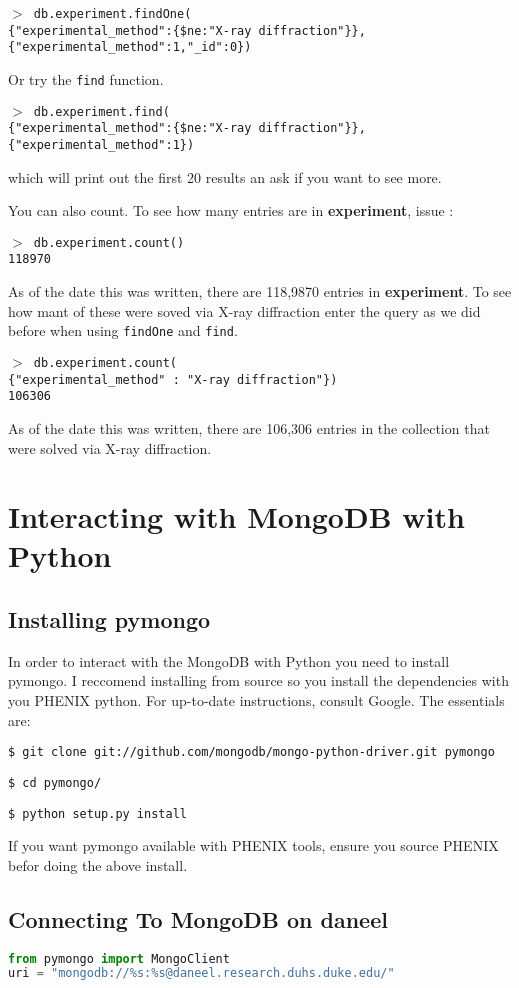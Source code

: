 \documentclass[12pt]{article}
\newcommand{\mdbcmdline}[1]{\vspace{5mm} \noindent
\texttt{$>$ #1}
\vspace{5mm}

}
\newcommand{\mdbcol}[1]{{\color{Bittersweet}\textbf{#1}}}
\begin{document}
\mdbcmdline{db.experiment.findOne(\\
\{"experimental\_method":\{\$ne:"X-ray diffraction"\}\}, \\
\{"experimental\_method":1,"\_id":0\})
}
\noindent

Or try the \texttt{find} function.

\mdbcmdline{db.experiment.find(\\
\{"experimental\_method":\{\$ne:"X-ray diffraction"\}\}, \\
\{"experimental\_method":1\})
}

\noindent
which will print out the first 20 results an ask if you want to see more.

\vspace{5mm}
\noindent
You can also count.
To see how many entries are in \mdbcol{experiment}, issue :

\mdbcmdline{db.experiment.count() \\
118970}

\noindent
As of the date this was written, there are 118,9870 entries in \mdbcol{experiment}.
To see how mant of these were soved via X-ray diffraction enter the query as we did before when using \texttt{findOne} and \texttt{find}.

\mdbcmdline{db.experiment.count(\\
\{"experimental\_method" : "X-ray diffraction"\}) \\
106306}

\noindent
As of the date this was written, there are 106,306 entries in the collection that were solved via X-ray diffraction.


\section{Interacting with MongoDB with Python}
\subsection{Installing pymongo}
In order to interact with the MongoDB with Python you need to install pymongo.
I reccomend installing from source so you install the dependencies with you PHENIX python.
For up-to-date instructions, consult Google.
The essentials are:

\vspace{5mm}
\noindent
\texttt{\$ git clone git://github.com/mongodb/mongo-python-driver.git pymongo}

\noindent
\texttt{\$ cd pymongo/}

\noindent
\texttt{\$ python setup.py install}

\vspace{5mm}
\noindent
If you want pymongo available with PHENIX tools, ensure you source PHENIX befor doing the above install.

\subsection{Connecting To MongoDB on daneel} 
\begin{lstlisting}[language=python]
from pymongo import MongoClient
uri = "mongodb://%s:%s@daneel.research.duhs.duke.edu/"

\end{lstlisting}
\end{document}

